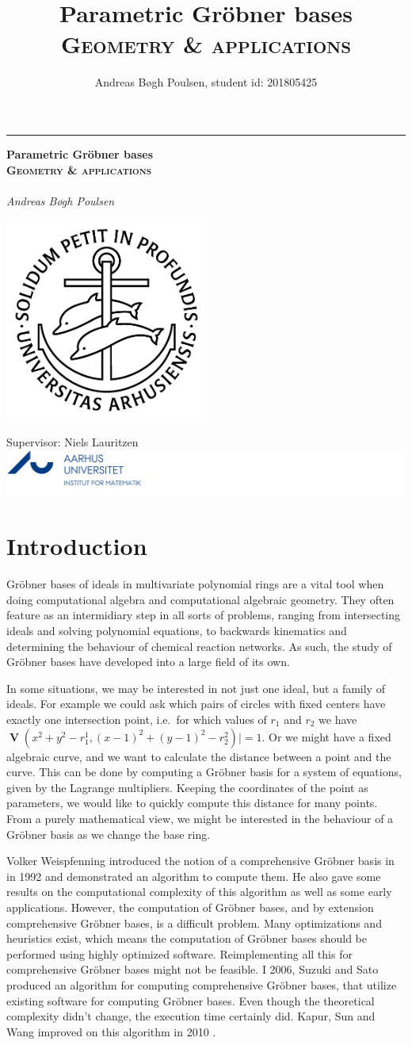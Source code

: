 \documentclass[a4paper, 12pt]{article}
\title{Parametric Gröbner bases\\{\large \textsc{Geometry \& applications}}}
\author{Andreas Bøgh Poulsen, student id: 201805425}
\DeclareMathOperator{\V}{\mathbf V}
\theoremstyle{changedot}
\theoremstyle{changedotbreak}
\theoremstyle{nonumberplain}
\newcommand*{\titleGM}{%
\hspace*{0.2\textwidth} %
\rule{1pt}{\textheight} %
\hspace*{0.05\textwidth} %
\parbox[b]{0.75\textwidth}{ %
{\noindent\Huge\bfseries  Parametric Gröbner bases\\{\large \textsc{Geometry \& applications}}\\}\\[2\baselineskip] %
{\large \textit{Andreas Bøgh Poulsen \hfill \oldstylenums{201805425} }}\\%
{\large } %
\parbox[b][0pt]{0.5\textwidth}{
  \hspace{2cm}\includegraphics[width=0.5\textwidth]{ausegl_sort.png}
  \vspace{-10cm}
}

\vspace{0.5\textheight} %
\vfill
{\noindent Supervisor: Niels Lauritzen \hspace{2.5cm} \includegraphics{AU_logo.png}  }\\[\baselineskip] %
}%
}
\begin{document}
{}
\titleGM
\newpage
\tableofcontents

\newpage
{}

\section*{Introduction}
Gröbner bases of ideals in multivariate polynomial rings are a vital tool when doing computational algebra and computational algebraic geometry. They often feature as an intermidiary step in all sorts of problems, ranging from intersecting ideals and solving polynomial equations, to backwards kinematics and determining the behaviour of chemical reaction networks\cite{IVA}. As such, the study of Gröbner bases have developed into a large field of its own.

In some situations, we may be interested in not just one ideal, but a family of ideals. For example we could ask which pairs of circles with fixed centers have exactly one intersection point, i.e.\ for which values of $r_{1}$ and $r_{2}$ we have $\V(x^{2} + y^{2} - r_{1}^{1}, (x - 1)^{2} + (y - 1)^{2} - r_{2}^{2})| = 1$. Or we might have a fixed algebraic curve, and we want to calculate the distance between a point and the curve. This can be done by computing a Gröbner basis for a system of equations, given by the Lagrange multipliers. Keeping the coordinates of the point as parameters, we would like to quickly compute this distance for many points. From a purely mathematical view, we might be interested in the behaviour of a Gröbner basis as we change the base ring.

Volker Weispfenning introduced the notion of a comprehensive Gröbner basis in \cite{Weispfenning} in 1992 and demonstrated an algorithm to compute them. He also gave some results on the computational complexity of this algorithm as well as some early applications. However, the computation of Gröbner bases, and by extension comprehensive Gröbner bases, is a difficult problem. Many optimizations and heuristics exist, which means the computation of Gröbner bases should be performed using highly optimized software. Reimplementing all this for comprehensive Gröbner bases might not be feasible. I 2006, Suzuki and Sato produced an algorithm for computing comprehensive Gröbner bases, that utilize existing software for computing Gröbner bases. Even though the theoretical complexity didn't change, the execution time certainly did. Kapur, Sun and Wang improved on this algorithm in 2010 \cite{KAPUR201327}\cite{10.1145/1837934.1837946}.
\end{document}

